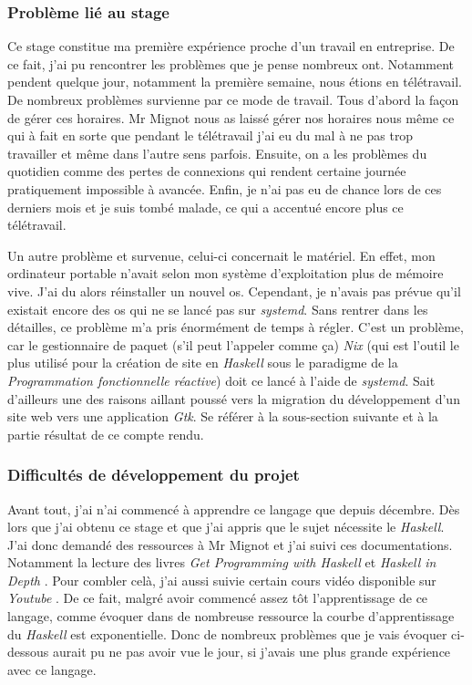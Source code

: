 \subsubsection{Problème lié au stage}

Ce stage constitue ma première expérience proche d'un travail en entreprise. De 
ce fait, j'ai pu rencontrer les problèmes que je pense nombreux ont. Notamment 
pendent quelque jour, notamment la première semaine, nous étions en télétravail.
De nombreux problèmes survienne par ce mode de travail. Tous d'abord la façon de 
gérer ces horaires. Mr Mignot nous as laissé gérer nos horaires nous même ce qui 
à fait en sorte que pendant le télétravail j'ai eu du mal à ne pas trop 
travailler et même dans l'autre sens parfois. Ensuite, on a les problèmes du 
quotidien comme des pertes de connexions qui rendent certaine journée 
pratiquement impossible à avancée. Enfin, je n'ai pas eu de chance lors de ces 
derniers mois et je suis tombé malade, ce qui a accentué encore plus ce 
télétravail.

\newpage

Un autre problème et survenue, celui-ci concernait le matériel. En effet, mon 
ordinateur portable n'avait selon mon système d'exploitation plus de mémoire 
vive. J'ai du alors réinstaller un nouvel os. Cependant, je n'avais pas prévue 
qu'il existait encore des os qui ne se lancé pas sur \textit{systemd}. Sans 
rentrer dans les détailles, ce problème m’a pris énormément de temps à régler. 
C'est un problème, car le gestionnaire de paquet (s'il peut l'appeler comme ça)
\textit{Nix} (qui est l'outil le plus utilisé pour la création de site en 
\textit{Haskell} sous le paradigme de la \textit{Programmation fonctionnelle 
réactive}) doit ce lancé à l'aide de \textit{systemd}. Sait d'ailleurs 
une des raisons aillant poussé vers la migration du développement d'un site web 
vers une application \textit{Gtk}. Se référer à la sous-section suivante et à la 
partie résultat de ce compte rendu. 

\subsubsection{Difficultés de développement du projet}

Avant tout, j'ai n'ai commencé à apprendre ce langage que depuis décembre. 
Dès lors que j'ai obtenu ce stage et que j'ai appris que le sujet nécessite le 
\textit{Haskell}. J'ai donc demandé des ressources à Mr Mignot et j'ai suivi 
ces documentations. Notamment la lecture des livres 
\textit{Get Programming with Haskell} et \textit{Haskell in Depth}
\cite{bookWithHaskell, haskellInDepth}. Pour combler celà, j'ai aussi suivie 
certain cours vidéo disponible sur \textit{Youtube}
\cite{playHaksell1, playHaksell2}. De ce fait, malgré avoir commencé assez 
tôt l'apprentissage de ce langage, comme évoquer dans de nombreuse ressource la 
courbe d'apprentissage du \textit{Haskell} est exponentielle. Donc de nombreux 
problèmes que je vais évoquer ci-dessous aurait pu ne pas avoir vue le jour, si 
j'avais une plus grande expérience avec ce langage.

